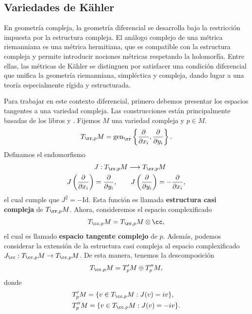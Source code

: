 \subsection{Variedades de Kähler}

En geometría compleja, la geometría diferencial se desarrolla bajo la restricción impuesta por la estructura compleja. El análogo complejo de una métrica riemanniana es una métrica hermitiana, que es compatible con la estructura compleja y permite introducir nociones métricas respetando la holomorfía. Entre ellas, las métricas de Kähler se distinguen por satisfacer una condición diferencial que unifica la geometría riemanniana, simpléctica y compleja, dando lugar a una teoría especialmente rígida y estructurada.

Para trabajar en este contexto diferencial, primero debemos presentar los espacios tangentes a una variedad compleja. Las construcciones están principalmente basadas de los libros \parencite[Sec. 1.2]{huybrechts2005complex} y \parencite[Cap. 1]{leecomplex}. Fijemos $M$ una variedad compleja y $p\in M$. 
\begin{equation*}
	T_{\rr,p}M=\mathrm{gen}_\rr\left\{\frac{\partial}{\partial x_i},\frac{\partial}{\partial y_i}\right\}.
\end{equation*} 
Definamos el endomorfismo
\begin{align*}
	&J:T_{\rr,p}M\longrightarrow T_{\rr,p}M\\
	J\left(\frac{\partial}{\partial x_i}  \right)&=\frac{\partial}{\partial y_i},\qquad J\left(\frac{\partial}{\partial y_i} \right)=-\frac{\partial}{\partial x_i},
\end{align*}
el cual cumple que $J^2=-\mathrm{Id}$. Esta función es llamada \textbf{estructura casi compleja} de $T_{\rr,p}M$. Ahora, consideremos el espacio complexificado
\begin{equation*}
	T_{\cc.p}M=T_{\rr,p}M\otimes \cc,
\end{equation*}
el cual es llamado \textbf{espacio tangente complejo} de $p$. Además, podemos considerar la extensión de la estructura casi compleja al espacio complexificado $J_\cc:T_{\cc.p}M\to T_{\cc.p}M$. De esta manera, tenemos la descomposición
\begin{equation*}
	T_{\cc.p}M=T_{p}^\prime M\oplus T_p^{\prime\prime}M, 
\end{equation*}
donde
\begin{align*}
	&T_{p}^\prime M=\{v\in T_{\cc.p}M: J(v)=iv\},\\		&T_p^{\prime\prime}M =\{v\in T_{\cc.p}M: J(v)=-iv\}.
\end{align*}
